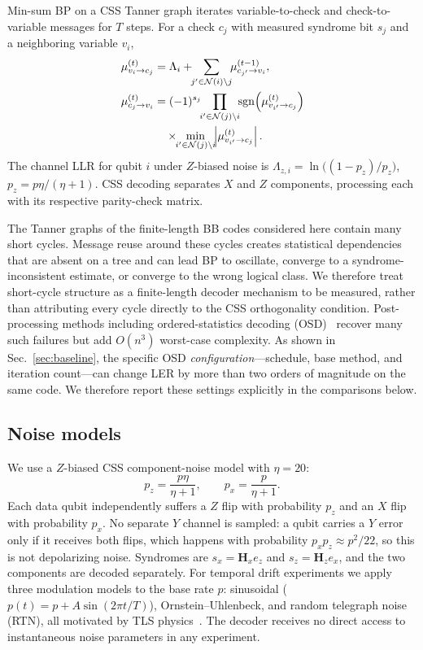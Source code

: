 \documentclass[a4paper,twocolumn,11pt,nopdfoutputerror]{quantumarticle}
\newcommand{\llr}{\Lambda}
\newcommand{\Hmat}{\mathbf{H}}
\begin{document}
Min-sum BP on a CSS Tanner graph iterates variable-to-check and
check-to-variable messages for $T$ steps. For a check $c_j$ with measured
syndrome bit $s_j$ and a neighboring variable $v_i$,
\begin{align}
\mu_{v_i \to c_j}^{(t)}
&= \llr_i + \!\!\sum_{j' \in \mathcal{N}(i)\setminus j}\!\!
\mu_{c_{j'} \to v_i}^{(t-1)},
\label{eq:vtc}\\
\mu_{c_j \to v_i}^{(t)}
&= (-1)^{s_j}
\!\!\prod_{i' \in \mathcal{N}(j)\setminus i}\!\!
\mathrm{sgn}\!\left(\mu_{v_{i'}\to c_j}^{(t)}\right) \notag\\
&\quad \times
\!\!\min_{i'\in\mathcal{N}(j)\setminus i}\!\!
\left|\mu_{v_{i'}\to c_j}^{(t)}\right|.
\label{eq:ctv}
\end{align}
The channel LLR for qubit $i$ under $Z$-biased noise is
$\llr_{z,i} = \ln\bigl((1-p_z)/p_z\bigr)$,
$p_z = p\eta/(\eta+1)$.
CSS decoding separates $X$ and $Z$ components, processing each with
its respective parity-check matrix.

The Tanner graphs of the finite-length BB codes considered here contain
many short cycles. Message reuse around these cycles creates statistical
dependencies that are absent on a tree and can lead BP to oscillate,
converge to a syndrome-inconsistent estimate, or converge to the wrong
logical class. We therefore treat short-cycle structure as a finite-length
decoder mechanism to be measured, rather than attributing every cycle
directly to the CSS orthogonality condition. Post-processing methods
including ordered-statistics decoding (OSD)~\cite{Fossorier1995OSD}
recover many such failures but add $O(n^3)$ worst-case complexity.
As shown in Sec.~\ref{sec:baseline}, the specific OSD
\emph{configuration}---schedule, base method, and iteration count---can
change LER by more than two orders of magnitude on the same code. We
therefore report these settings explicitly in the comparisons below.

\subsection{Noise models}\label{sec:noise}

We use a $Z$-biased CSS component-noise model with $\eta = 20$:
\begin{equation}
p_z = \frac{p\eta}{\eta+1}, \qquad p_x = \frac{p}{\eta+1}.
\label{eq:bias}
\end{equation}
Each data qubit independently suffers a $Z$ flip with probability $p_z$
and an $X$ flip with probability $p_x$. No separate $Y$ channel is
sampled: a qubit carries a $Y$ error only if it receives both flips,
which happens with probability $p_xp_z\approx p^2/22$, so this is not
depolarizing noise. Syndromes are $s_x=\Hmat_x e_z$ and
$s_z=\Hmat_z e_x$, and the two components are decoded separately.
For temporal drift experiments we apply three modulation models
to the base rate $p$: sinusoidal ($p(t) = p + A\sin(2\pi t/T)$),
Ornstein--Uhlenbeck, and random telegraph noise (RTN), all
motivated by TLS physics~\cite{Klimov2018,Carroll2022}. The decoder
receives no direct access to instantaneous noise parameters in any
experiment.
\end{document}
